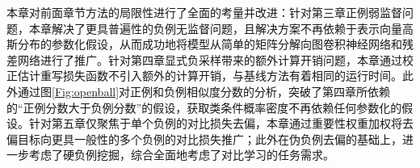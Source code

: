 本章对前面章节方法的局限性进行了全面的考量并改进：针对第三章正例弱监督问题，本章解决了更具普遍性的负例无监督问题，且解决方案不再依赖于表示向量高斯分布的参数化假设，从而成功地将模型从简单的矩阵分解向图卷积神经网络和残差网络进行了推广。针对第四章显式负采样带来的额外计算开销问题，本章通过校正估计重写损失函数不引入额外的计算开销，与基线方法有着相同的运行时间。此外通过图\ref{Fig:openball}对正例和负例相似度分数的分析，突破了第四章所依赖的“正例分数大于负例分数”的假设，获取类条件概率密度不再依赖任何参数化的假设。针对第五章仅聚焦于单个负例的对比损失去偏，本章通过重要性权重加权将去偏目标向更具一般性的多个负例的对比损失推广；此外在伪负例去偏的基础上，进一步考虑了硬负例挖掘，综合全面地考虑了对比学习的任务需求。

